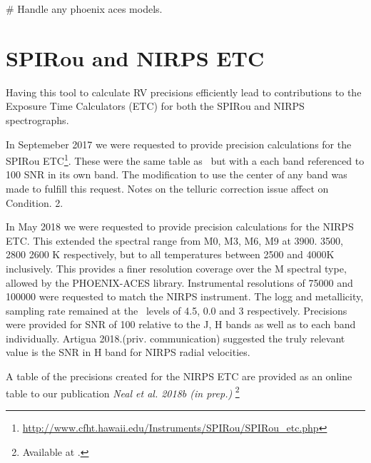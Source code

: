 \# Handle any phoenix aces models.


\section{SPIRou and NIRPS ETC}
Having this tool to calculate RV precisions efficiently lead to contributions to the Exposure Time Calculators (ETC) for both the SPIRou and NIRPS spectrographs.

In Septemeber 2017 we were requested to provide precision calculations for the SPIRou ETC\footnote{\url{http://www.cfht.hawaii.edu/Instruments/SPIRou/SPIRou_etc.php}}. These were the same table as~\citet{figueira_radial_2016} but with a each band referenced to 100 SNR in its own band. The modification to use the center of any band was made to fulfill this request. Notes on the telluric correction issue affect on Condition. 2.  

In May 2018 we were requested to provide precision calculations for the NIRPS ETC. This extended the spectral range from M0, M3, M6, M9 at 3900. 3500, 2800 2600 K respectively, but to all temperatures between 2500 and 4000K inclusively. This provides a finer resolution coverage over the M spectral type, allowed by the PHOENIX-ACES library.
Instrumental resolutions of 75000 and 100000 were requested to match the NIRPS instrument.
The logg and metallicity, sampling rate remained at the~\citet{figueira_radial_2016} levels of 4.5, 0.0 and 3 respectively.
Precisions were provided for SNR of 100 relative to the J, H bands as well as to each band individually. Artigua 2018.(priv. communication) suggested the truly relevant value is the SNR in H band for NIRPS radial velocities.

A table of the precisions created for the NIRPS ETC are provided as an online table to our publication \textit{Neal et al. 2018b (in prep.)} \footnote{Available at \url{}.}  

